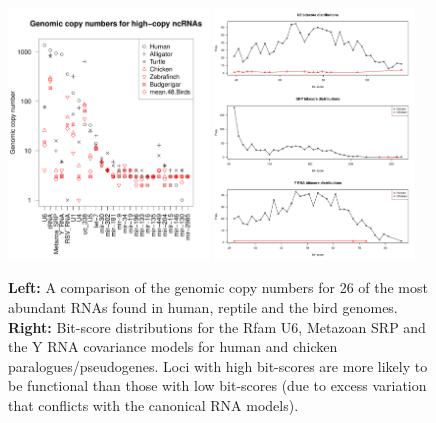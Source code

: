 \documentclass[10pt]{bmc_article}
\newenvironment{bmcformat}{\begin{raggedright}\baselineskip20pt\sloppy\setboolean{publ}{false}}{\end{raggedright}\baselineskip20pt\sloppy}
\begin{document}
\begin{bmcformat}
\begin{figure}[ht]
\includegraphics[width=0.475\textwidth]{figures/high-copy-numbers.pdf}
\includegraphics[width=0.475\textwidth]{figures/high-copy-numbers-U6-SRP.pdf}
  \caption[]{{\bf Left:} A comparison of the genomic copy numbers for
    26 of the most abundant RNAs found in human, reptile and the bird
    genomes. {\bf Right:} Bit-score distributions for the Rfam U6,
    Metazoan SRP and the Y RNA covariance models for human and chicken
    paralogues/pseudogenes. Loci with high bit-scores are more likely
    to be functional than those with low bit-scores (due to excess
    variation that conflicts with the canonical RNA
    models).}\label{fig:14}
\end{figure}



\end{bmcformat}
\end{document}
